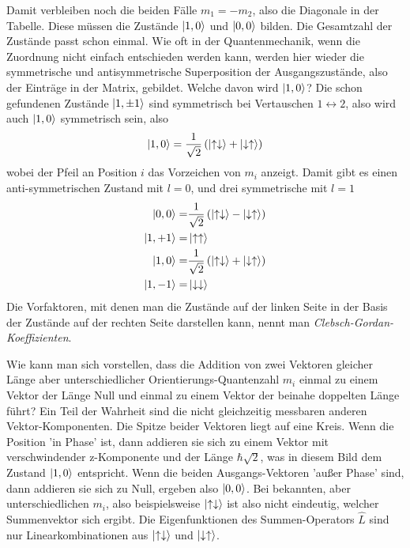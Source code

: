 Damit verbleiben noch die beiden Fälle $m_1 = - m_2$, also die Diagonale in der Tabelle. Diese müssen die Zustände $\ket{1, 0}$ und $\ket{0,0}$ bilden. Die Gesamtzahl der Zustände passt schon einmal. Wie oft in der Quantenmechanik, wenn die Zuordnung nicht einfach entschieden werden kann, werden hier wieder die symmetrische und antisymmetrische Superposition der Ausgangszustände, also der Einträge in der Matrix, gebildet. Welche davon wird $\ket{1, 0}$? Die schon gefundenen Zustände $\ket{1, \pm 1} $ sind symmetrisch bei Vertauschen $1 \leftrightarrow 2$, also wird auch $\ket{1, 0}$ symmetrisch sein, also 
\begin{equation}
\ket{1, 0} = \frac{1}{\sqrt{2}} \left( \ket{\uparrow \downarrow} +  \ket{\downarrow \uparrow} \right)
\end{equation}
wobei der Pfeil an Position $i$ das Vorzeichen von $m_i$ anzeigt.
Damit gibt es einen anti-symmetrischen Zustand mit $l = 0$, und drei symmetrische mit $l=1$
\begin{align}
\ket{0, 0} = & \frac{1}{\sqrt{2}} \left( \ket{\uparrow \downarrow} -  \ket{\downarrow \uparrow} \right) \\
\ket{1, +1} =& \ket{\uparrow \uparrow}  \\
\ket{1, 0} = &\frac{1}{\sqrt{2}} \left( \ket{\uparrow \downarrow} +  \ket{\downarrow \uparrow} \right) \\
\ket{1, -1} = &\ket{\downarrow \downarrow}  
\end{align}
Die Vorfaktoren, mit denen man die Zustände auf der linken Seite in der Basis der Zustände auf der rechten Seite darstellen kann, nennt man \emph{Clebsch-Gordan-Koeffizienten}. 

Wie kann man sich vorstellen, dass die Addition von zwei Vektoren gleicher Länge aber unterschiedlicher Orientierungs-Quantenzahl $m_i$ einmal zu einem Vektor der Länge Null und einmal zu einem Vektor der beinahe doppelten Länge führt? Ein Teil der Wahrheit sind die nicht gleichzeitig messbaren anderen Vektor-Komponenten. Die Spitze beider Vektoren liegt auf eine Kreis. Wenn die Position 'in Phase' ist, dann addieren sie sich zu einem Vektor mit verschwindender z-Komponente und der Länge $\hbar \sqrt{2}$, was in diesem Bild dem Zustand $\ket{1,0}$ entspricht. Wenn die beiden Ausgangs-Vektoren 'außer Phase' sind, dann addieren sie sich zu Null, ergeben also  $\ket{0,0}$. Bei bekannten, aber unterschiedlichen $m_i$, also beispielsweise $\ket{\uparrow \downarrow}$ ist also nicht eindeutig, welcher Summenvektor sich ergibt. Die Eigenfunktionen des Summen-Operators $\hat{L}$ sind nur Linearkombinationen aus $\ket{\uparrow \downarrow}$ und $\ket{\downarrow \uparrow}$.

